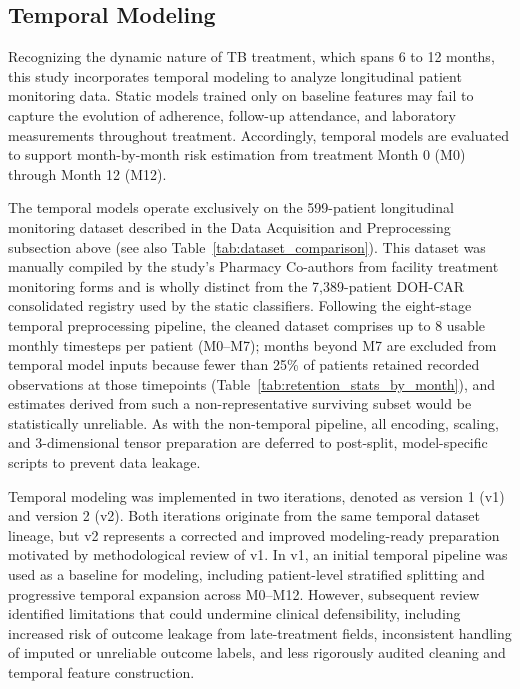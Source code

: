 \documentclass[12pt]{article}
\begin{document}
\subsection{Temporal Modeling}

Recognizing the dynamic nature of TB treatment, which spans 6 to 12 months, this study incorporates temporal modeling to analyze longitudinal patient monitoring data. Static models trained only on baseline features may fail to capture the evolution of adherence, follow-up attendance, and laboratory measurements throughout treatment. Accordingly, temporal models are evaluated to support month-by-month risk estimation from treatment Month 0 (M0) through Month 12 (M12).

The temporal models operate exclusively on the 599-patient longitudinal monitoring dataset described in the Data Acquisition and Preprocessing subsection above (see also Table~\ref{tab:dataset_comparison}). This dataset was manually compiled by the study's Pharmacy Co-authors from facility treatment monitoring forms and is wholly distinct from the 7,389-patient DOH-CAR consolidated registry used by the static classifiers. Following the eight-stage temporal preprocessing pipeline, the cleaned dataset comprises up to 8 usable monthly timesteps per patient (M0--M7); months beyond M7 are excluded from temporal model inputs because fewer than 25\% of patients retained recorded observations at those timepoints (Table~\ref{tab:retention_stats_by_month}), and estimates derived from such a non-representative surviving subset would be statistically unreliable. As with the non-temporal pipeline, all encoding, scaling, and 3-dimensional tensor preparation are deferred to post-split, model-specific scripts to prevent data leakage.

Temporal modeling was implemented in two iterations, denoted as version 1 (v1) and version 2 (v2). Both iterations originate from the same temporal dataset lineage, but v2 represents a corrected and improved modeling-ready preparation motivated by methodological review of v1. In v1, an initial temporal pipeline was used as a baseline for modeling, including patient-level stratified splitting and progressive temporal expansion across M0--M12. However, subsequent review identified limitations that could undermine clinical defensibility, including increased risk of outcome leakage from late-treatment fields, inconsistent handling of imputed or unreliable outcome labels, and less rigorously audited cleaning and temporal feature construction.
\end{document}
